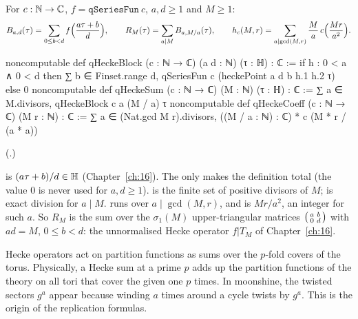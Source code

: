 \begin{definition}\label{ch19:def:qhecke}
For $c:{\mathbb{N}}\to{\mathbb{C}}$, $f=\mathtt{qSeriesFun}\ c$, $a,d\ge1$ and $M\ge1$:
\begin{equation*}
  B_{a,d}(\tau)=\sum_{0\le b<d}f\Bigl(\frac{a\tau+b}d\Bigr),\qquad R_M(\tau)=\sum_{a\mid M}B_{a,M/a}(\tau),\qquad
  h_c(M,r)=\sum_{a\mid\gcd(M,r)}\frac Ma\,c\Bigl(\frac{Mr}{a^2}\Bigr).
\end{equation*}
\end{definition}
\begin{leancode}
noncomputable def qHeckeBlock (c : ℕ → ℂ) (a d : ℕ) (τ : ℍ) : ℂ :=
  if h : 0 < a ∧ 0 < d then
    ∑ b ∈ Finset.range d, qSeriesFun c (heckePoint a d b h.1 h.2 τ)
  else 0
noncomputable def qHeckeSum (c : ℕ → ℂ) (M : ℕ) (τ : ℍ) : ℂ :=
  ∑ a ∈ M.divisors, qHeckeBlock c a (M / a) τ
noncomputable def qHeckeCoeff (c : ℕ → ℂ) (M r : ℕ) : ℂ :=
  ∑ a ∈ (Nat.gcd M r).divisors, ((M / a : ℕ) : ℂ) * c (M * r / (a * a))
\end{leancode}
(.)
\begin{dictionary}
 is $(a\tau+b)/d\in\mathbb{H}$ (Chapter~\ref{ch:16}).  The 
only makes the definition total (the value $0$ is never used for $a,d\ge1$).   is the finite set of
positive divisors of $M$;  is exact division for $a\mid M$.   runs over
$a\mid\gcd(M,r)$, and  is $Mr/a^2$, an integer for such $a$.  So $R_M$ is the sum over the
$\sigma_1(M)$ upper-triangular matrices $\left(\begin{smallmatrix}a&b\\0&d\end{smallmatrix}\right)$ with $ad=M$, $0\le b<d$: the unnormalised Hecke operator
$f|T_M$ of Chapter~\ref{ch:16}.
\end{dictionary}

\begin{physics}
Hecke operators act on partition functions as sums over the $p$-fold covers of the torus. Physically, a Hecke sum at
a prime $p$ adds up the partition functions of the theory on all tori that cover the given one $p$ times. In
moonshine, the twisted sectors $g^a$ appear because winding $a$ times around a cycle twists by $g^a$. This is the
origin of the replication formulas.
\end{physics}

